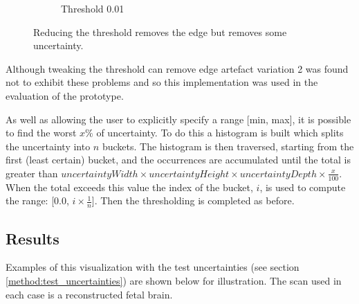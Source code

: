\begin{figure}[H]
\begin{subfigure}[b]{0.5\textwidth}
    \caption{Threshold 0.01}
    \label{fig:thresholdingvariation1threshold3}  
  \end{subfigure}  
  \caption{Reducing the threshold removes the edge but removes some uncertainty.}\label{fig:thresholdingvariationfix}
\end{figure}

Although tweaking the threshold can remove edge artefact variation 2 was found not to exhibit these problems and so this implementation was used in the evaluation of the prototype.

As well as allowing the user to explicitly specify a range [min, max], it is possible to find the worst $x\%$ of uncertainty. To do this a histogram is built which splits the uncertainty into $n$ buckets. The histogram is then traversed, starting from the first (least certain) bucket, and the occurrences are accumulated until the total is greater than $uncertaintyWidth \times uncertaintyHeight \times uncertaintyDepth \times \frac{x}{100}$. When the total exceeds this value the index of the bucket, $i$, is used to compute the range: [0.0, $i \times \frac{1}{n}$]. Then the thresholding is completed as before.

\newpage
\subsection*{Results}
Examples of this visualization with the test uncertainties (see section \ref{method:test_uncertainties}) are shown below for illustration. The scan used in each case is a reconstructed fetal brain.

